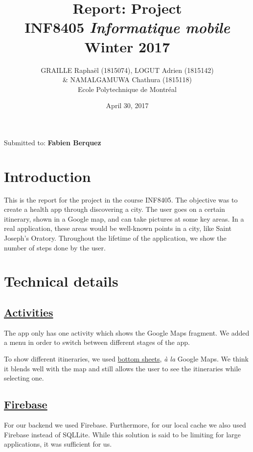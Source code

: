 \documentclass{article}
\title{Report: Project\\ INF8405 \textit{Informatique mobile}\\ Winter 2017 }
\author{GRAILLE Raphaël  (1815074), LOGUT Adrien (1815142) \\ \& NAMALGAMUWA Chathura (1815118)\\ Ecole Polytechnique de Montréal}
\date{April 30, 2017}
\begin{document}
\maketitle

Submitted to: \textbf{Fabien Berquez}
\newpage

\tableofcontents

\newpage

\section{Introduction}

This is the report for the project in the course INF8405. The objective was to create a health app through discovering a city. The user goes on a certain itinerary, shown in a Google map, and can take pictures at some key areas. In a real application, these areas would be well-known points in a city, like Saint Joseph's Oratory. Throughout the lifetime of the application, we show the number of steps done by the user. 

\section{Technical details}


\subsection{\href{http://data.whicdn.com/images/28718572/large.gif}{Activities}}

The app only has one activity which shows the Google Maps fragment. We added a menu in order to switch between different stages of the app. 

To show different itineraries, we used \href{https://material.io/guidelines/components/bottom-sheets.html}{bottom sheets}, \textit{à la} Google Maps. We think it blends well with the map and still allows the user to see the itineraries while selecting one. 

\subsection{\href{http://bestanimations.com/Nature/Fire/simpsons-fire-gif.gif}{Firebase}}

For our backend we used Firebase. Furthermore, for our local cache we also used Firebase instead of SQLLite. While this solution is said to be limiting for large applications, it was sufficient for us. 
\end{document}
